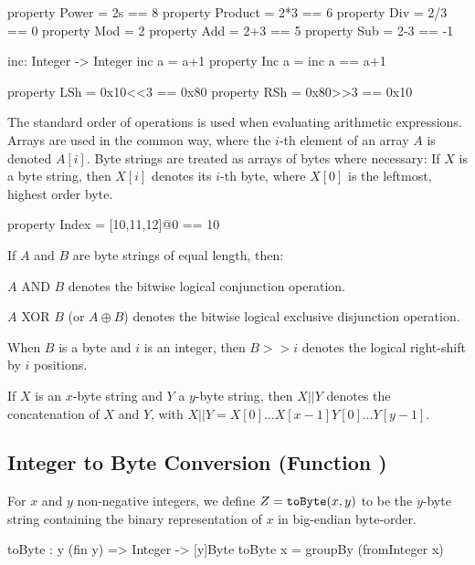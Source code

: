 \begin{code}
  property Power = 2^^3 == 8
  property Product = 2*3 == 6
  property Div = 2/3 == 0
  property Mod = 2%
  property Add = 2+3 == 5
  property Sub = 2-3 == -1

  inc: Integer -> Integer
  inc a = a+1
  property Inc a = inc a == a+1

  property LSh = 0x10<<3 == 0x80
  property RSh = 0x80>>3 == 0x10
\end{code}

   The standard order of operations is used when evaluating arithmetic
   expressions.
   \\

   Arrays are used in the common way, where the $i$-th element of an array
   $A$ is denoted $A[i]$.  Byte strings are treated as arrays of bytes where
   necessary: If $X$ is a byte string, then $X[i]$ denotes its $i$-th byte,
   where $X[0]$ is the leftmost, highest order byte.

\begin{code}
  property Index = [10,11,12]@0 == 10
\end{code}

   If $A$ and $B$ are byte strings of equal length, then:
   \begin{description}
    \item $A$ AND $B$ denotes the bitwise logical conjunction operation.
    \item $A$ XOR $B$ (or $A \oplus B$) denotes the bitwise logical exclusive disjunction
      operation.
   \end{description}

   When $B$ is a byte and $i$ is an integer, then $B >> i$ denotes the logical
   right-shift by $i$ positions.

   If $X$ is an $x$-byte string and $Y$ a $y$-byte string, then $X || Y$ denotes
   the concatenation of $X$ and $Y$, with $X || Y = X[0] \ldots X[x-1] Y[0] \ldots
   Y[y-1]$.

\subsection{Integer to Byte Conversion (Function \toByte)}\label{func:tobyte}

   For $x$ and $y$  non-negative integers, we define $Z = \texttt{toByte}(x, y)$ to
   be the $y$-byte string containing the binary representation of $x$ in
   big-endian byte-order.

\begin{code}
  toByte : {y} (fin y) => Integer -> [y]Byte
  toByte x = groupBy (fromInteger x)
\end{code}

